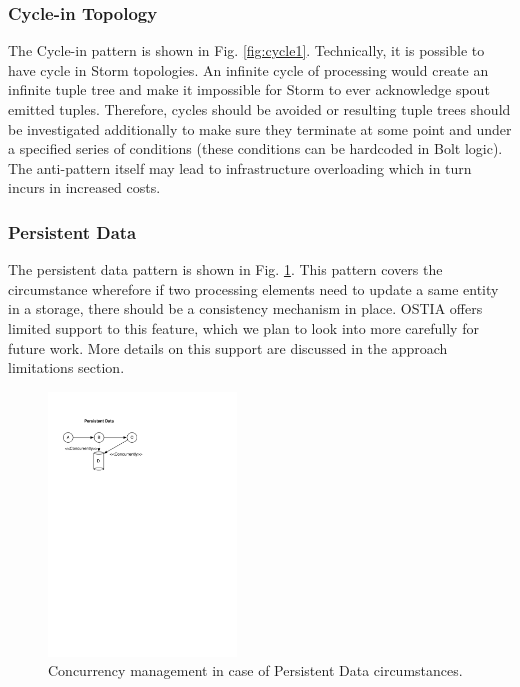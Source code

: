 \documentclass[smallextended]{svjour3}       %
\begin{document}
\subsubsection{Cycle-in Topology}

The Cycle-in pattern is shown in Fig. \ref{fig:cycle1}. Technically, it is possible to have cycle in Storm topologies. An infinite cycle of processing would create an infinite tuple tree and make it impossible for Storm to ever acknowledge spout emitted tuples. Therefore, cycles should be avoided or resulting tuple trees should be investigated additionally to make sure they terminate at some point and under a specified series of conditions (these conditions can be hardcoded in Bolt logic). The anti-pattern itself may lead to infrastructure overloading which in turn incurs in increased costs.


\subsubsection{Persistent Data}

The persistent data pattern is shown in Fig. \ref{fig:persistence}. This pattern covers the circumstance wherefore if two processing elements need to update a same entity in a storage, there should be a consistency mechanism in place. OSTIA offers limited support to this feature, which we plan to look into more carefully for future work. More details on this support are discussed in the approach limitations section.

\begin{figure}
	\begin{center}
		\includegraphics[width=5cm,draft]{fig4}
		\caption{Concurrency management in case of Persistent Data circumstances.}
		\label{fig:persistence}
	\end{center}
\end{figure}
\end{document}
